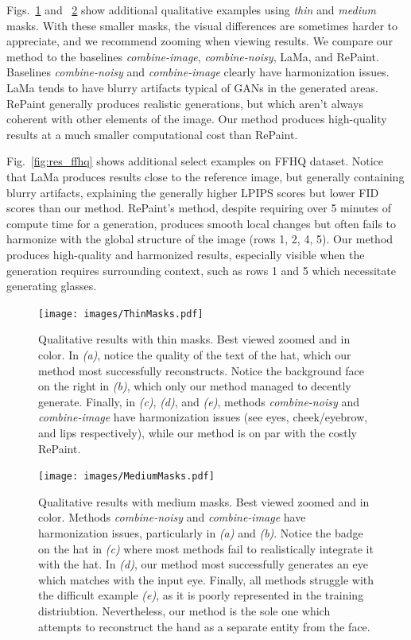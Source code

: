 Figs.~\ref{fig:qualitative_thin} and ~\ref{fig:qualitative_thick} show additional qualitative examples using \emph{thin} and \emph{medium} masks. With these smaller masks, the visual differences are sometimes harder to appreciate, and we recommend zooming when viewing results. We compare our method to the baselines \emph{combine-image}, \emph{combine-noisy}, LaMa, and RePaint. Baselines \emph{combine-noisy} and \emph{combine-image} clearly have harmonization issues. LaMa tends to have blurry artifacts typical of GANs in the generated areas. RePaint generally produces realistic generations, but which aren't always coherent with other elements of the image. Our method produces high-quality results at a much smaller computational cost than RePaint.


Fig.~\ref{fig:res_ffhq} shows additional select examples on FFHQ dataset. Notice that LaMa produces results close to the reference image, but generally containing blurry artifacts, explaining the generally higher LPIPS scores but lower FID scores than our method. RePaint's method, despite requiring over 5 minutes of compute time for a generation, produces smooth local changes but often fails to harmonize with the global structure of the image (rows 1, 2, 4, 5). Our method produces high-quality and harmonized results, especially visible when the generation requires surrounding context, such as rows 1 and 5 which necessitate generating glasses.

\begin{figure}
    \centering
    \texttt{[image: images/ThinMasks.pdf]}
    \caption{Qualitative results with thin masks. Best viewed zoomed and in color. In \emph{(a)}, notice the quality of the text of the hat, which our method most successfully reconstructs. Notice the background face on the right in \emph{(b)}, which only our method managed to decently generate. Finally, in \emph{(c)}, \emph{(d)}, and \emph{(e)}, methods \emph{combine-noisy} and \emph{combine-image} have harmonization issues (see eyes, cheek/eyebrow, and lips respectively), while our method is on par with the costly RePaint.}
    \label{fig:qualitative_thin}
\end{figure}

\begin{figure}
    \centering
    \texttt{[image: images/MediumMasks.pdf]}
    \caption{Qualitative results with medium masks. Best viewed zoomed and in color. Methods \emph{combine-noisy} and \emph{combine-image} have harmonization issues, particularly in \emph{(a)} and \emph{(b)}. Notice the badge on the hat in \emph{(c)} where most methods fail to realistically integrate it with the hat. In \emph{(d)}, our method most successfully generates an eye which matches with the input eye. Finally, all methods struggle with the difficult example \emph{(e)}, as it is poorly represented in the training distriubtion.  Nevertheless, our method is the sole one which attempts to reconstruct the hand as a separate entity from the face.}
    \label{fig:qualitative_thick}
\end{figure}


